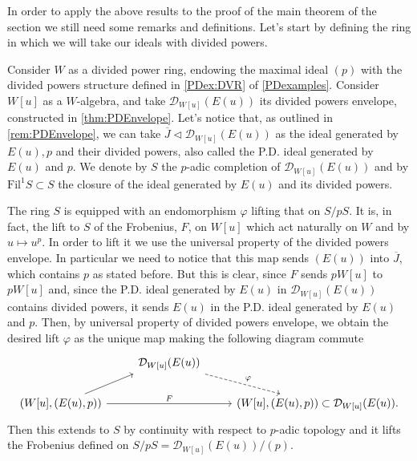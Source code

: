 \noindent
In order to apply the above results to the proof of the main theorem of the section
we still need some remarks and definitions.
Let's start by defining the ring in which we will take
our ideals with divided powers.
\begin{defn}[]
	Consider $W$ as a divided power ring, endowing the maximal ideal $(p)$
	with the divided powers structure defined in \cref{PDex:DVR} of \cref{PDexamples}.
	Consider $W[u]$ as a $W$-algebra, and take $\mathcal{D}_{W[u]}(E(u))$
	its divided powers envelope, constructed in \cref{thm:PDEnvelope}.
	Let's notice that, as outlined in \cref{rem:PDEnvelope},
	we can take $\overline{J} \triangleleft \mathcal{D}_{W[u]}(E(u))$ 
	as the ideal generated by $E(u), p$ and their divided powers,
	also called the P.D. ideal generated by $E(u)$ and $p$.
	We denote by $S$ the $p$-adic completion of $\mathcal{D}_{W[u]}(E(u))$
	and by $\mathrm{Fil}^1 S \subset S$ the closure of the ideal
	generated by $E(u)$ and its divided powers.
\end{defn}


\begin{rem}[]\label{rem:liftFrobeniusS}
	The ring $S$ is equipped with an endomorphism $\varphi$ lifting that on $S/pS$.
	It is, in fact, the lift to $S$ of the Frobenius, $F$, on $W[u]$ which act naturally
	on $W$ and by $u \mapsto u^p$.
	In order to lift it we use the universal property of
	the divided powers envelope.
	In particular we need to notice that this map sends $(E(u))$
	into $\overline{J}$, which contains $p$ as stated before.
	But this is clear, since $F$ sends $pW[u]$ to $pW[u]$ and, 
	since the P.D. ideal generated by $E(u)$ in $\mathcal{D}_{W[u]}(E(u))$
	contains divided powers, it sends $E(u)$ in the P.D. ideal
	generated by $E(u)$ and $p$.
	Then, by universal property of divided powers envelope, we obtain the desired 
	lift $\varphi$ as the unique map making the following diagram commute
	\begin{equation*}
	\begin{tikzcd}
		&
		\mathcal{D}_{W[u]}(E(u))
		\arrow[rd, "\varphi", dashrightarrow,
		start anchor=south east] & \\
		\left( W[u], (E(u),p)\right) \arrow[ru, "", rightarrow,
		end anchor=south west] 
		\arrow[rr, "F", rightarrow] & &
		\left( W[u], (E(u),p)\right) \subset
		\mathcal{D}_{W[u]}(E(u)). 
	\end{tikzcd}
	\end{equation*}
	Then this extends to $S$ by continuity with respect to $p$-adic
	topology and it lifts the Frobenius defined on
	$S/pS = \mathcal{D}_{W[u]}(E(u))/ (p)$.
\end{rem}



